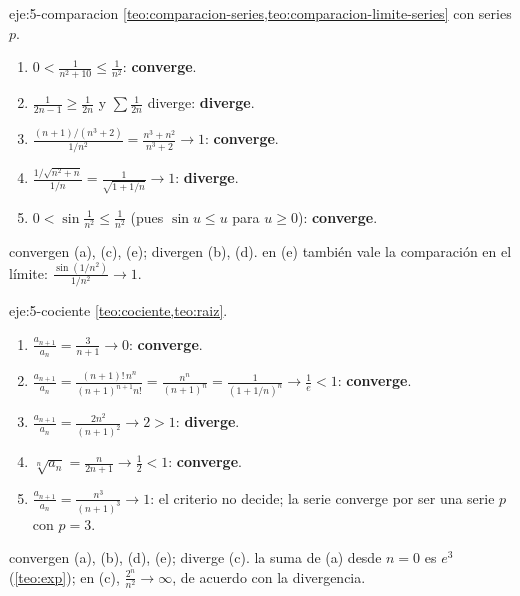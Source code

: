 \begin{solucion}{eje:5-comparacion}
\planteamiento \cref{teo:comparacion-series,teo:comparacion-limite-series} con series $p$.
\pasos
\begin{enumerate}[label=(\alph*)]
  \item $0<\frac{1}{n^{2}+10}\le\frac{1}{n^{2}}$: \textbf{converge}.
  \item $\frac{1}{2n-1}\ge\frac{1}{2n}$ y $\sum\frac{1}{2n}$ diverge: \textbf{diverge}.
  \item $\frac{(n+1)/(n^{3}+2)}{1/n^{2}}=\frac{n^{3}+n^{2}}{n^{3}+2}\to1$: \textbf{converge}.
  \item $\frac{1/\sqrt{n^{2}+n}}{1/n}=\frac{1}{\sqrt{1+1/n}}\to1$: \textbf{diverge}.
  \item $0<\sin\frac{1}{n^{2}}\le\frac{1}{n^{2}}$ (pues $\sin u\le u$ para $u\ge0$): \textbf{converge}.
\end{enumerate}
\resultado convergen (a), (c), (e); divergen (b), (d).
\comprobacion en (e) también vale la comparación en el límite: $\frac{\sin(1/n^{2})}{1/n^{2}}\to1$.
\end{solucion}

\begin{solucion}{eje:5-cociente}
\planteamiento \cref{teo:cociente,teo:raiz}.
\pasos
\begin{enumerate}[label=(\alph*)]
  \item $\frac{a_{n+1}}{a_n}=\frac{3}{n+1}\to0$: \textbf{converge}.
  \item $\frac{a_{n+1}}{a_n}=\frac{(n+1)!\,n^{n}}{(n+1)^{n+1}n!}=\frac{n^{n}}{(n+1)^{n}}=\frac{1}{(1+1/n)^{n}}\to\frac1e<1$: \textbf{converge}.
  \item $\frac{a_{n+1}}{a_n}=\frac{2n^{2}}{(n+1)^{2}}\to2>1$: \textbf{diverge}.
  \item $\sqrt[n]{a_n}=\frac{n}{2n+1}\to\frac12<1$: \textbf{converge}.
  \item $\frac{a_{n+1}}{a_n}=\frac{n^{3}}{(n+1)^{3}}\to1$: el criterio no decide; la serie converge por ser una serie $p$ con $p=3$.
\end{enumerate}
\resultado convergen (a), (b), (d), (e); diverge (c).
\comprobacion la suma de (a) desde $n=0$ es $e^{3}$ (\cref{teo:exp}); en (c), $\frac{2^{n}}{n^{2}}\to\infty$, de acuerdo con la divergencia.
\end{solucion}

